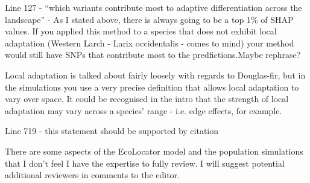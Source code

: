 
\begin{point}{} %
Line 127 - ``which variants contribute most to adaptive differentiation across the landscape'' - As I stated above, there is always going to be a top 1\% of SHAP values. If you applied this method to a species that does not exhibit local adaptation (Western Larch - Larix occidentalis - comes to mind) your method would still have SNPs that contribute most to the predfictions.Maybe rephrase?
\end{point}

\begin{point}{} %
Local adaptation is talked about fairly loosely with regards to Douglas-fir, but in the simulations you use a very precise definition that allows local adaptation to vary over space. It could be recognised in the intro that the strength of local adaptation may vary across a species' range - i.e. edge effects, for example.
\end{point}


\begin{point}{} %
Line 719 - this statement should be supported by citation
\end{point}



\begin{itquote}
There are some aspects of the EcoLocator model and the population simulations that I don't feel I have the expertise to fully review. I will suggest potential additional reviewers in comments to the editor.
\end{itquote}

